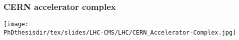 \begin{frame}
\frametitle{CERN accelerator complex}
\begin{center}
\texttt{[image: \\PhDthesisdir/tex/slides/LHC-CMS/LHC/CERN\_Accelerator-Complex.jpg]}
\end{center}
\end{frame}
